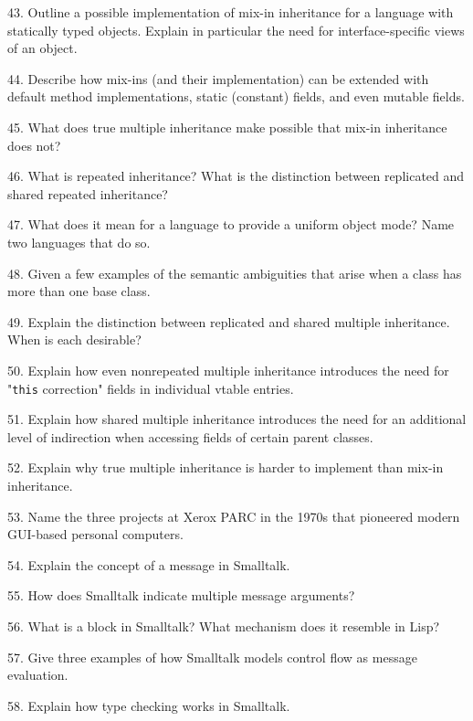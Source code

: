 \filbreak
\vskip 1cm

43. Outline a possible implementation of mix-in inheritance for a language with statically typed objects. Explain in particular the need for interface-specific views of an object.

\filbreak
\vskip 1cm

44. Describe how mix-ins (and their implementation) can be extended with default method implementations, static (constant) fields, and even mutable fields.

\filbreak
\vskip 1cm

45. What does true multiple inheritance make possible that mix-in inheritance does not?

\filbreak
\vskip 1cm

46. What is repeated inheritance? What is the distinction between replicated and shared repeated inheritance?

\filbreak
\vskip 1cm

47. What does it mean for a language to provide a uniform object mode? Name two languages that do so.

\filbreak
\vskip 1cm

48. Given a few examples of the semantic ambiguities that arise when a class has more than one base class.

\filbreak
\vskip 1cm

49. Explain the distinction between replicated and shared multiple inheritance. When is each desirable?

\filbreak
\vskip 1cm

50. Explain how even nonrepeated multiple inheritance introduces the need for "{\tt this} correction" fields in individual vtable entries.

\filbreak
\vskip 1cm

51. Explain how shared multiple inheritance introduces the need for an additional level of indirection when accessing fields of certain parent classes.

\filbreak
\vskip 1cm

52. Explain why true multiple inheritance is harder to implement than mix-in inheritance.

\filbreak
\vskip 1cm

53. Name the three projects at Xerox PARC in the 1970s that pioneered modern GUI-based personal computers.

\filbreak
\vskip 1cm

54. Explain the concept of a message in Smalltalk.

\filbreak
\vskip 1cm

55. How does Smalltalk indicate multiple message arguments?

\filbreak
\vskip 1cm

56. What is a block in Smalltalk? What mechanism does it resemble in Lisp?

\filbreak
\vskip 1cm

57. Give three examples of how Smalltalk models control flow as message evaluation.

\filbreak
\vskip 1cm

58. Explain how type checking works in Smalltalk.

\filbreak
\vfill\eject
\bye
